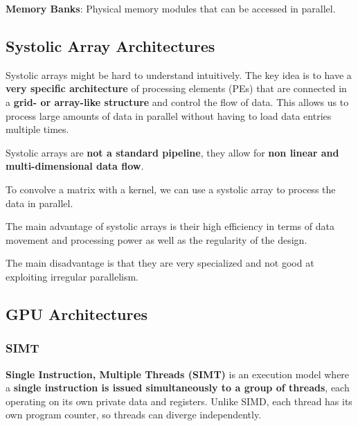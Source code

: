 \begin{definition}
	\textbf{Memory Banks}: Physical memory modules that can be accessed in parallel.
\end{definition}

\subsection{Systolic Array Architectures}

\begin{remark}
	Systolic arrays might be hard to understand intuitively. The key idea is to have a \textbf{very specific architecture} of processing elements (PEs) that are connected in a \textbf{grid- or array-like structure} and control the flow of data. This allows us to process large amounts of data in parallel without having to load data entries multiple times.
\end{remark}

\begin{important}
	Systolic arrays are \textbf{not a standard pipeline}, they allow for \textbf{non linear and multi-dimensional data flow}.
\end{important}

\begin{example}
	To convolve a matrix with a kernel, we can use a systolic array to process the data in parallel.
\end{example}

\begin{remark}
	The main advantage of systolic arrays is their high efficiency in terms of data movement and processing power as well as the regularity of the design.
\end{remark}

\begin{remark}
	The main disadvantage is that they are very specialized and not good at exploiting irregular parallelism.
\end{remark}

\subsection{GPU Architectures}

\subsubsection{SIMT}

\begin{definition}
	\textbf{Single Instruction, Multiple Threads (SIMT)} is an execution model where a \textbf{single instruction is issued simultaneously to a group of threads}, each operating on its own private data and registers. Unlike SIMD, each thread has its own program counter, so threads can diverge independently.
\end{definition}

